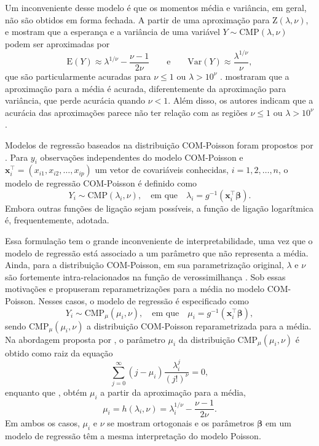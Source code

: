 \documentclass[
    oldfontcommands,
    11pt,
    openright,
    twoside,
    a4paper,
    english,
    brazil
]{abntex2}\usepackage[]{graphicx}\usepackage[]{color}
\begin{document}
Um inconveniente desse modelo é que os momentos média e variância, em
geral, não são obtidos em forma fechada. A partir de uma aproximação
para Z$(\lambda, \nu)$, \citet{Shmueli2005} e
\citet{Sellers2010} mostram que a esperança e a variância de uma
variável $Y \sim \text{CMP}(\lambda, \nu)$ podem ser aproximadas por
\begin{equation}
    \label{eqn:mean-aprox}
  \text{E}(Y) \approx \lambda^{1/\nu} - \frac{\nu - 1}{2\nu} \qquad
  \textrm{e} \qquad
  \text{Var}(Y) \approx \frac{\lambda^{1/\nu}}{\nu},
\end{equation}
que são particularmente acuradas para $\nu \leq 1$ ou $\lambda > 10^\nu$
\citep{Shmueli2005}. \citet{RibeiroJr2018} mostraram que a aproximação
para a média é acurada, diferentemente da aproximação para variância,
que perde acurácia quando $\nu<1$. Além disso, os autores indicam que a
acurácia das aproximações parece não ter relação com as regiões
$\nu \leq 1$ ou $\lambda > 10^\nu$.

Modelos de regressão baseados na distribuição COM-Poisson foram
propostos por \citet{Sellers2010}. Para $y_i$ observações
independentes do modelo COM-Poisson e
$\bm{x}_i^\top = (x_{i1}, x_{i2}, \ldots, x_{ip})$ um vetor de
covariáveis conhecidas, $i=1,2,\ldots,n$, o modelo de regressão
COM-Poisson é definido como
$$
Y_i \sim \text{CMP}(\lambda_i, \nu), \quad \text{em que} \quad
  \lambda_i = g^{-1}(\bm{x}_i^\top\bm{\beta}).
$$
Embora outras funções de ligação sejam possíveis, a função de ligação
logarítmica é, frequentemente, adotada.

Essa formulação tem o grande inconveniente de interpretabilidade, uma
vez que o modelo de regressão está associado a um parâmetro que não
representa a média. Ainda, para a distribuição COM-Poisson, em sua
parametrização original, $\lambda$ e $\nu$ são fortemente
intra-relacionados na função de verossimilhança
\citep{RibeiroJr2018}. Sob essas motivações \citet{Huang2017} e
\citet{RibeiroJr2018} propuseram reparametrizações para a média no
modelo COM-Poisson. Nesses casos, o modelo de regressão é especificado
como
$$
Y_i \sim \text{CMP}_\mu(\mu_i, \nu), \quad \text{em que} \quad
  \mu_i = g^{-1}(\bm{x}_i^\top\bm{\beta}),
$$
sendo $\text{CMP}_\mu(\mu_i, \nu)$ a distribuição COM-Poisson
reparametrizada para a média. Na abordagem proposta por
, o parâmetro $\mu_i$ da distribuição
$\text{CMP}_\mu(\mu_i, \nu)$ é obtido como raiz da equação
$$ \sum_{j=0}^{\infty} (j-\mu_i) \frac{\lambda_i^j}{(j!)^\nu} = 0, $$
enquanto que , obtém $\mu_i$ a partir
da aproximação para a média,
$$ \mu_i = h(\lambda_i, \nu) = \lambda_i^{1/\nu} - \frac{\nu -
  1}{2\nu}. $$
Em ambos os casos, $\mu_i$ e $\nu$ se mostram ortogonais e os parâmetros
$\bm{\beta}$ em um modelo de regressão têm a mesma interpretação do
modelo Poisson.
\end{document}
